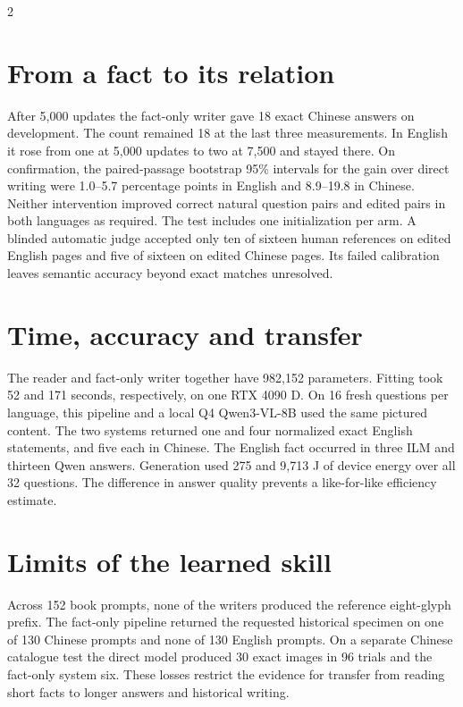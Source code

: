 \begin{multicols}{2}
\section*{From a fact to its relation}
After 5,000 updates the fact-only writer gave 18 exact Chinese answers on development. The count remained 18 at the last three measurements. In English it rose from one at 5,000 updates to two at 7,500 and stayed there. On confirmation, the paired-passage bootstrap 95\% intervals for the gain over direct writing were 1.0--5.7 percentage points in English and 8.9--19.8 in Chinese. Neither intervention improved correct natural question pairs and edited pairs in both languages as required. The test includes one initialization per arm. A blinded automatic judge accepted only ten of sixteen human references on edited English pages and five of sixteen on edited Chinese pages. Its failed calibration leaves semantic accuracy beyond exact matches unresolved.
\section*{Time, accuracy and transfer}
The reader and fact-only writer together have 982,152 parameters. Fitting took 52 and 171 seconds, respectively, on one RTX 4090 D. On 16 fresh questions per language, this pipeline and a local Q4 Qwen3-VL-8B used the same pictured content. The two systems returned one and four normalized exact English statements, and five each in Chinese. The English fact occurred in three ILM and thirteen Qwen answers. Generation used 275 and 9,713 J of device energy over all 32 questions. The difference in answer quality prevents a like-for-like efficiency estimate.
\section*{Limits of the learned skill}
Across 152 book prompts, none of the writers produced the reference eight-glyph prefix. The fact-only pipeline returned the requested historical specimen on one of 130 Chinese prompts and none of 130 English prompts. On a separate Chinese catalogue test the direct model produced 30 exact images in 96 trials and the fact-only system six. These losses restrict the evidence for transfer from reading short facts to longer answers and historical writing.
\end{multicols}
\newpage

